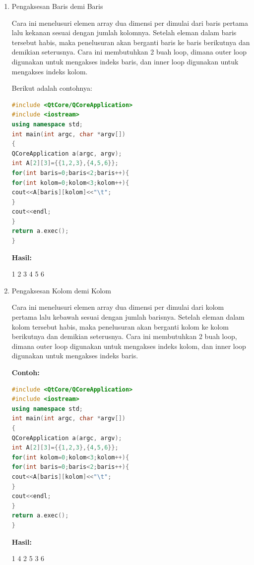 \begin{enumerate}
\item Pengaksesan Baris demi Baris

Cara ini menelusuri elemen array dua dimensi per dimulai dari baris
pertama lalu kekanan sesuai dengan jumlah kolomnya. Setelah eleman dalam
baris tersebut habis, maka penelusuran akan berganti baris ke baris
berikutnya dan demikian seterusnya. Cara ini membutuhkan 2 buah loop,
dimana outer loop digunakan untuk mengakses indeks baris, dan inner loop
digunakan untuk mengakses indeks kolom.

Berikut adalah contohnya:

\begin{lstlisting}[language=c++, caption=Pengaksesan Baris demi Baris, label=contoh3-13]
#include <QtCore/QCoreApplication>
#include <iostream>
using namespace std;
int main(int argc, char *argv[])
{
QCoreApplication a(argc, argv);
int A[2][3]={{1,2,3},{4,5,6}};
for(int baris=0;baris<2;baris++){
for(int kolom=0;kolom<3;kolom++){
cout<<A[baris][kolom]<<"\t";
}
cout<<endl;
}
return a.exec();
}
\end{lstlisting}

\textbf{Hasil:}

\begin{lcverbatim}
1 2 3
4 5 6
\end{lcverbatim}

\item Pengaksesan Kolom demi Kolom

Cara ini menelusuri elemen array dua dimensi per dimulai dari kolom
pertama lalu kebawah sesuai dengan jumlah barisnya. Setelah eleman dalam
kolom tersebut habis, maka penelusuran akan berganti kolom ke kolom
berikutnya dan demikian seterusnya. Cara ini membutuhkan 2 buah loop,
dimana outer loop digunakan untuk mengakses indeks kolom, dan inner loop
digunakan untuk mengakses indeks baris.

\textbf{Contoh:}

\begin{lstlisting}[language=c++, caption=Pengaksesan Kolom demi Kolom, label=contoh3-14]
#include <QtCore/QCoreApplication>
#include <iostream>
using namespace std;
int main(int argc, char *argv[])
{
QCoreApplication a(argc, argv);
int A[2][3]={{1,2,3},{4,5,6}};
for(int kolom=0;kolom<3;kolom++){
for(int baris=0;baris<2;baris++){
cout<<A[baris][kolom]<<"\t";
}
cout<<endl;
}
return a.exec();
}
\end{lstlisting}

\textbf{Hasil:}

\begin{lcverbatim}
1 4
2 5
3 6
\end{lcverbatim}

\end{enumerate}







